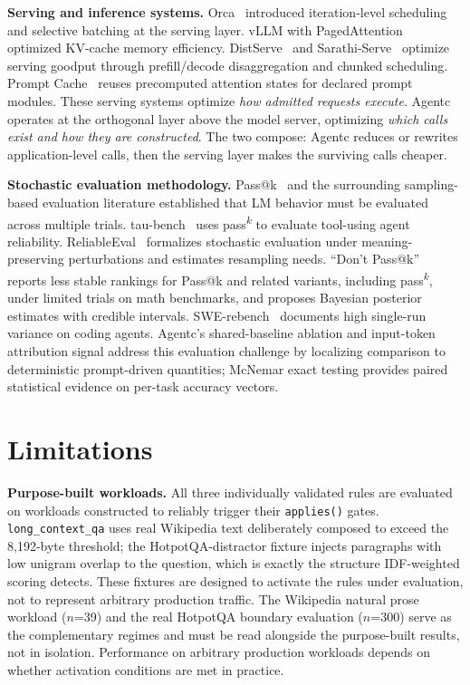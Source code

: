 \textbf{Serving and inference systems.} Orca~\cite{yu2022orca} introduced
iteration-level scheduling and selective batching at the serving layer. vLLM with
PagedAttention~\cite{kwon2023vllm} optimized KV-cache memory efficiency.
DistServe~\cite{zhong2024distserve} and Sarathi-Serve~\cite{agrawal2024sarathiserve}
optimize serving goodput through prefill/decode disaggregation and chunked scheduling.
Prompt Cache~\cite{gim2024promptcache} reuses precomputed attention states for
declared prompt modules. These serving systems optimize \emph{how admitted requests
execute}. Agentc operates at the orthogonal layer above the model server, optimizing
\emph{which calls exist and how they are constructed}. The two compose: Agentc reduces
or rewrites application-level calls, then the serving layer makes the surviving calls
cheaper.

\textbf{Stochastic evaluation methodology.} Pass@k~\cite{chen2021humaneval} and the
surrounding sampling-based evaluation literature established that LM behavior must be
evaluated across multiple trials. tau-bench~\cite{yao2025taubench} uses
pass\textsuperscript{$k$} to evaluate tool-using agent reliability.
ReliableEval~\cite{lior2025reliableeval} formalizes stochastic evaluation under
meaning-preserving perturbations and estimates resampling needs. ``Don't
Pass@k''~\cite{hariri2026passk} reports less stable rankings for Pass@k and
related variants, including pass\textsuperscript{$k$}, under limited trials on
math benchmarks, and proposes Bayesian posterior estimates with credible
intervals. SWE-rebench~\cite{badertdinov2025swerebench} documents high single-run
variance on coding agents. Agentc's shared-baseline ablation and input-token
attribution signal address this evaluation challenge by localizing comparison to
deterministic prompt-driven quantities; McNemar exact testing provides paired
statistical evidence on per-task accuracy vectors.

\section{Limitations}
\label{sec:limitations}

\textbf{Purpose-built workloads.} All three individually validated rules are evaluated
on workloads constructed to reliably trigger their \texttt{applies()} gates.
\texttt{long\_context\_qa} uses real Wikipedia text deliberately composed to exceed
the 8,192-byte threshold; the HotpotQA-distractor fixture injects paragraphs with
low unigram overlap to the question, which is exactly the structure IDF-weighted
scoring detects. These fixtures are designed to activate the rules under evaluation,
not to represent arbitrary production traffic. The Wikipedia natural prose workload
($n$=39) and the real HotpotQA boundary evaluation ($n$=300) serve as the
complementary regimes and must be read alongside the purpose-built results, not in
isolation. Performance on arbitrary production workloads depends on whether
activation conditions are met in practice.

